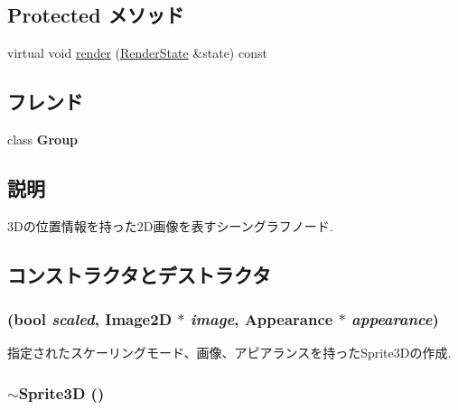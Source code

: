 \subsection*{Protected メソッド}
\begin{CompactItemize}
\item 
virtual void \hyperlink{classm3g_1_1Sprite3D_8babc8a79b78615da51161e94029eea9}{render} (\hyperlink{structm3g_1_1RenderState}{RenderState} \&state) const 
\end{CompactItemize}
\subsection*{フレンド}
\begin{CompactItemize}
\item 
\hypertarget{classm3g_1_1Sprite3D_2697825715974a353728f0d4d5658112}{
class \textbf{Group}}
\label{classm3g_1_1Sprite3D_2697825715974a353728f0d4d5658112}

\end{CompactItemize}


\subsection{説明}
3Dの位置情報を持った2D画像を表すシーングラフノード. 

\subsection{コンストラクタとデストラクタ}
\hypertarget{classm3g_1_1Sprite3D_9cb33fd453d441ed8e99b95f5e29df0c}{
\subsubsection[{Sprite3D}]{ (bool {\em scaled}, \/  {\bf Image2D} $\ast$ {\em image}, \/  {\bf Appearance} $\ast$ {\em appearance})}}
\label{classm3g_1_1Sprite3D_9cb33fd453d441ed8e99b95f5e29df0c}


指定されたスケーリングモード、画像、アピアランスを持ったSprite3Dの作成. \hypertarget{classm3g_1_1Sprite3D_a57bd1e3141ba11c88ddec1e46c188d6}{
\subsubsection[{$\sim$Sprite3D}]{\setlength{\rightskip}{0pt plus 5cm}$\sim${\bf Sprite3D} ()}}
\label{classm3g_1_1Sprite3D_a57bd1e3141ba11c88ddec1e46c188d6}



